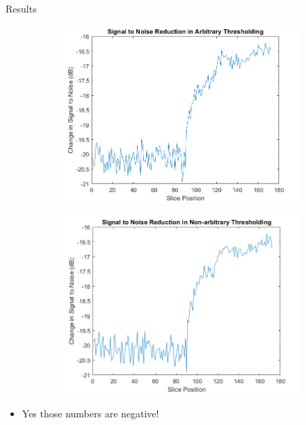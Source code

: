 \documentclass[aspectratio=169,xcolor=dvipsnames]{beamer}
\begin{document}
	\begin{frame}{Results}
		\begin{figure}
			\centering
			\begin{subfigure}[t]{0.45\textwidth}
				\centering
				\includegraphics[width=\linewidth]{SignalToNoiseSlices.png} 
			\end{subfigure}
			\hfill
			\begin{subfigure}[t]{0.45\textwidth}
				\centering
				\includegraphics[width=\linewidth]{SignalToNoiseSlicesNA.png} 
			\end{subfigure}
		\end{figure}
		\begin{itemize}
			\item Yes those numbers are negative! 
		\end{itemize}
	\end{frame}
	
\end{document}
